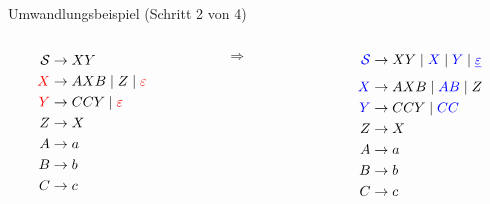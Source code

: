 \documentclass{beamer}
\begin{document}
{{\begin{exampleblock}{Umwandlungsbeispiel (Schritt 2 von 4)}
\begin{columns}[c]
\begin{column}{0.3\textwidth}
\begin{align*}
\mathcal{S} &\rightarrow XY\\
\textcolor{red}{X} &\rightarrow AXB \mid Z \mid \textcolor{red}{\varepsilon}\\
\textcolor{red}{Y} &\rightarrow CCY \mid \textcolor{red}{\varepsilon}\\
Z &\rightarrow X\\
A &\rightarrow a\\
B &\rightarrow b\\
C &\rightarrow c\\
\end{align*}
\end{column}
%
\
\begin{column}{0.05\textwidth}
$\Rightarrow$
\end{column}
%
\begin{column}{0.3\textwidth}
\begin{align*}
\textcolor{blue}{\mathcal{S}} &\rightarrow XY \mid \textcolor{blue}{X} \mid  \textcolor{blue}{Y} \mid \textcolor{blue}{\sout{\varepsilon}}\\
\textcolor{blue}{X} &\rightarrow AXB \mid \textcolor{blue}{AB} \mid Z \\
\textcolor{blue}{Y} &\rightarrow CCY \mid \textcolor{blue}{CC}\\
Z &\rightarrow X\\
A &\rightarrow a\\
B &\rightarrow b\\
C &\rightarrow c\\
\end{align*}
\end{column}
\end{columns}
\end{exampleblock}
}



}
\end{document}
